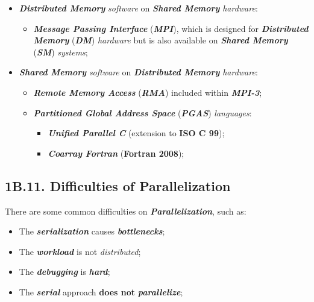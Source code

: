 \vspace{-0.2cm}
\begin{itemize}
    \item \textbf{\emph{Distributed Memory}} \emph{software} on \textbf{\emph{Shared Memory}} \emph{hardware}:
    \vspace{-0.2cm}
    \begin{itemize}
        \item \textbf{\emph{Message Passing Interface}} (\textbf{\emph{MPI}}), which is designed for \textbf{\emph{Distributed Memory}} (\textbf{\emph{DM}}) \emph{hardware} but is also available on \textbf{\emph{Shared Memory}} (\textbf{\emph{SM}}) \emph{systems};
    \end{itemize}
    \item \textbf{\emph{Shared Memory}} \emph{software} on \textbf{\emph{Distributed Memory}} \emph{hardware}:
    \vspace{-0.2cm}
    \begin{itemize}
        \item \textbf{\emph{Remote Memory Access}} (\textbf{\emph{RMA}}) included within \textbf{\emph{MPI-3}};
        \item \textbf{\emph{Partitioned Global Address Space}} (\textbf{\emph{PGAS}}) \emph{languages}:
        \begin{itemize}
            \item \textbf{\emph{Unified Parallel C}} (extension to \textbf{ISO C 99});
            \item \textbf{\emph{Coarray Fortran}} (\textbf{Fortran 2008});
        \end{itemize}
    \end{itemize}
\end{itemize}

\newpage

\subsection*{\large{\textbf{1B.11. Difficulties of Parallelization}}}
\label{ssec:lecture-1B11}

\noindent There are some common difficulties on \textbf{\emph{Parallelization}}, such as:

\vspace{-0.2cm}
\begin{itemize}
    \item The \textbf{\emph{serialization}} causes \textbf{\emph{bottlenecks}};
    \item The \textbf{\emph{workload}} is not \emph{distributed};
    \item The \textbf{\emph{debugging}} is \textbf{\emph{hard}};
    \item The \textbf{\emph{serial}} approach \textbf{does not} \textbf{\emph{parallelize}};
\end{itemize}

